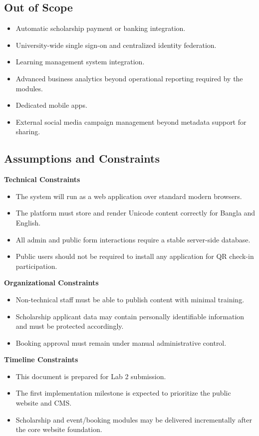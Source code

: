 \documentclass[12pt,a4paper]{article}
\begin{document}
\subsection{Out of Scope}

\begin{itemize}[nosep]
\item Automatic scholarship payment or banking integration.
\item University-wide single sign-on and centralized identity federation.
\item Learning management system integration.
\item Advanced business analytics beyond operational reporting required by the modules.
\item Dedicated mobile apps.
\item External social media campaign management beyond metadata support for sharing.
\end{itemize}

\subsection{Assumptions and Constraints}

\textbf{Technical Constraints}
\begin{itemize}[nosep]
\item The system will run as a web application over standard modern browsers.
\item The platform must store and render Unicode content correctly for Bangla and English.
\item All admin and public form interactions require a stable server-side database.
\item Public users should not be required to install any application for QR check-in participation.
\end{itemize}

\textbf{Organizational Constraints}
\begin{itemize}[nosep]
\item Non-technical staff must be able to publish content with minimal training.
\item Scholarship applicant data may contain personally identifiable information and must be protected accordingly.
\item Booking approval must remain under manual administrative control.
\end{itemize}

\textbf{Timeline Constraints}
\begin{itemize}[nosep]
\item This document is prepared for Lab 2 submission.
\item The first implementation milestone is expected to prioritize the public website and CMS.
\item Scholarship and event/booking modules may be delivered incrementally after the core website foundation.
\end{itemize}
\end{document}
